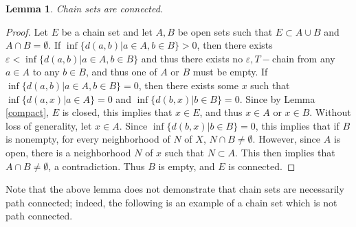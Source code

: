 \documentclass[11pt]{article}
\newtheorem{lem}[thm]{Lemma}
\begin{document}
\begin{lem}\label{chainconnected}
Chain sets are connected.
\end{lem}
\begin{proof}
Let $E$ be a chain set and let $A,B$ be open sets such that $E\subset A\cup B$ and $A\cap B=\emptyset$.  If $\inf\{d(a,b)|a\in A, b\in B\}>0$, then there exists $\varepsilon<\inf\{d(a,b)|a\in A, b\in B\}$ and thus there exists no $\varepsilon, T-$chain from any $a\in A$ to any $b\in B$, and thus one of $A$ or $B$ must be empty.  If $\inf\{d(a,b)|a\in A, b\in B\}=0$, then there exists some $x$ such that $\inf\{d(a,x)|a\in A\}=0$ and $\inf\{d(b,x)|b\in B\}=0$.  Since by Lemma \ref{compact}, $E$ is closed, this implies that $x\in E$, and thus $x\in A$ or $x\in B$.  Without loss of generality, let $x\in A$.  Since $\inf\{d(b,x)|b\in B\}=0$, this implies that if $B$ is nonempty, for every neighborhood of $N$ of $X$, $N\cap B\not= \emptyset$.  However, since $A$ is open, there is a neighborhood $N$ of $x$ such that $N\subset A$.  This then implies that $A\cap B\not = \emptyset$, a contradiction.  Thus $B$ is empty, and $E$ is connected.

\end{proof}

\noindent Note that the above lemma does not demonstrate that chain sets are necessarily path connected; indeed, the following is an example of a chain set which is not path connected. 
\end{document}
